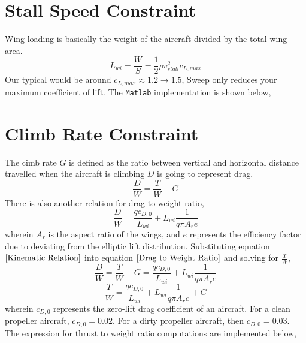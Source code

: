 \documentclass[letter, 12pt]{article}
\begin{document}
\begin{center}
\section{Stall Speed Constraint}
\begin{comment}
\end{comment}
Wing loading is basically the weight of the aircraft divided by the total wing area.
\begin{equation}L_{wi} = \frac{W}{S} = \frac{1}{2}\rho v_{stall}^{2} c_{L,max} \label{Wing Loading Definition}\end{equation}
Our typical would be around $c_{L,max} \approx 1.2 \to 1.5$, 
Sweep only reduces your maximum coefficient of lift. The \texttt{Matlab} implementation is shown below,


\section{Climb Rate Constraint}
\begin{comment}
\end{comment}
The cimb rate $G$ is defined as the ratio between vertical and horizontal distance travelled when the aircraft is climbing
$D$ is going to represent drag. 
\begin{equation}\frac{D}{W} = \frac{T}{W } - G \label{Kinematic Relation}\end{equation}
There is also another relation for drag to weight ratio,
\begin{equation}\frac{D}{W } = \frac{qc_{D,0}}{L_{wi}} + L_{wi}\frac{1}{q\pi A_{r}e} \label{Drag to Weight Ratio}\end{equation}
wherein $A_{r}$ is the aspect ratio of the wings, and $e$ represents the efficiency factor due to deviating from the elliptic lift distribution.
Substituting equation $\ref{Kinematic Relation}$ into equation $\ref{Drag to Weight Ratio}$ and solving for $\displaystyle\frac{T}{W }$,
$$\frac{D}{W } = \frac{T}{W } - G  = \frac{qc_{D,0}}{L_{wi}} + L_{wi}\frac{1}{q\pi A_{r}e} $$
$$\frac{T}{W }  = \frac{qc_{D,0}}{L_{wi}} + L_{wi}\frac{1}{q\pi A_{r}e} + G $$
wherein $c_{D,0}$ represents the zero-lift drag coefficient of an aircraft. For a clean propeller aircraft, $c_{D,0} = 0.02$. For a dirty propeller aircraft, then $c_{D,0} = 0.03$.
The expression for thrust to weight ratio computations are implemented below,



\end{center}
\end{document}
